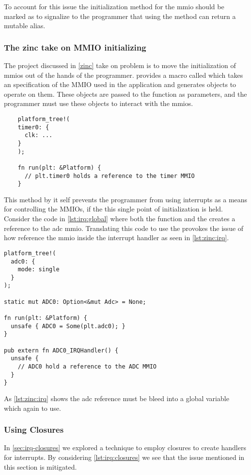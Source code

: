 To account for this issue the initialization method for the \gls{mmio} should be marked as {\unsafe} to signalize to the programmer that using the method can return a mutable alias.

\subsubsection{The zinc take on MMIO initializing}

The  project discussed in \autoref{zinc} take on problem is to move the initialization of \glspl{mmio} out of the hands of the programmer.
 provides a macro called  which takes an specification of the MMIO used in the application and generates objects to operate on them.
These objects are passed to the \main function as parameters, and the programmer must use these objects to interact with the \glspl{mmio}.

\begin{listing}[H]
  \begin{verbatim}
    platform_tree!(
    timer0: {
      clk: ...
    }
    );

    fn run(plt: &Platform) {
      // plt.timer0 holds a reference to the timer MMIO
    }
  \end{verbatim}
  \caption{}
  \label{lst:zinc:platformtree}
\end{listing}

This method by it self prevents the programmer from using interrupts as a means for controlling the MMIOs, if the this single point of initialization is held.
Consider the code in \autoref{lst:irq:global} where both the \main function and the  creates a reference to the \gls{adc} \gls{mmio}.
Translating this code to use the   provokes the issue of how reference the \gls{mmio} inside the interrupt handler as seen in \autoref{lst:zinc:irq}.

\begin{listing}[H]
  \begin{verbatim}
platform_tree!(
  adc0: {
    mode: single
  }
);

static mut ADC0: Option<&mut Adc> = None;

fn run(plt: &Platform) {
  unsafe { ADC0 = Some(plt.adc0); }
}

pub extern fn ADC0_IRQHandler() {
  unsafe {
    // ADC0 hold a reference to the ADC MMIO
  }
}
  \end{verbatim}
  \caption{}
  \label{lst:zinc:irq}
\end{listing}

As \autoref{lst:zinc:irq} shows the adc reference must be bleed into a global variable which again {\unsafe} to use.

\subsubsection{Using Closures}

In \autoref{sec:irq-closures} we explored a technique to employ closures to create handlers for interrupts.
By considering \autoref{lst:irq:closures} we see that the issue mentioned in this section is mitigated.
